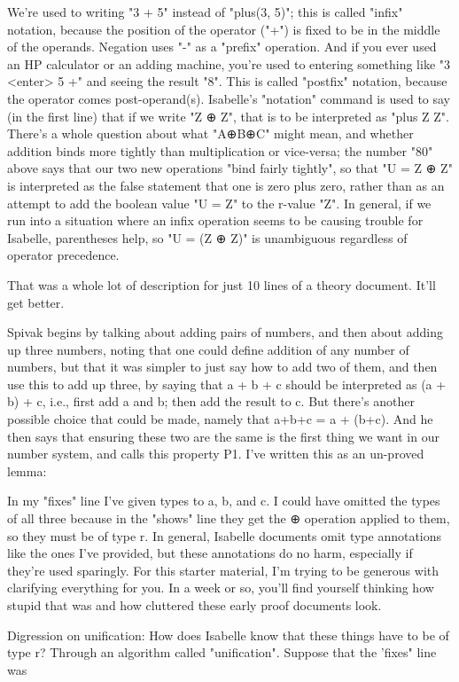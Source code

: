 We're used to writing "3 + 5" instead of "plus(3, 5)"; this is called "infix" notation, because the position of the operator ("+") is fixed to be in the middle of the operands. Negation uses "-" as a "prefix" operation. And if you ever used an HP calculator or an adding machine, you're used to entering something like "3 <enter> 5 +" and seeing the result "8". This is called "postfix" notation, because the operator comes post-operand(s). Isabelle's "notation" command is used to say (in the first line) that if we write "Z ⊕ Z", that is to be interpreted as "plus Z Z". There's a whole question about what "A⊕B⊕C" might mean, and whether addition binds more tightly than multiplication or vice-versa; the number "80" above says that our two new operations "bind fairly tightly", so that "U = Z ⊕ Z" is interpreted as the false statement that one is zero plus zero, rather than as an attempt to add the boolean value "U = Z" to the r-value "Z". In general, if we run into a situation where an infix operation seems to be causing trouble for Isabelle, parentheses help, so "U = (Z ⊕ Z)" is unambiguous regardless of operator precedence. 

That was a whole lot of description for just 10 lines of a theory document. It'll get better. 

Spivak begins by talking about adding pairs of numbers, and then about adding up three numbers, noting that one could define addition of any number of numbers, but that it was simpler to just say how to add two of them, and then use this to add up three, by saying that a + b + c should be interpreted as (a + b) + c, i.e., first add a and b; then add the result to c. But there's another possible choice that could be made, namely that a+b+c = a + (b+c). And he then says that ensuring these two are the same is the first thing we want in our number system, and calls this property P1. I've written this as an un-proved lemma: 

In my "fixes" line I've given types to a, b, and c. I could have omitted the types of all three because in the "shows" line they get the ⊕ operation applied to them, so they must be of type r. In general, Isabelle documents omit type annotations like the ones I've provided, but these annotations do no harm, especially if they're used sparingly. For this starter material, I'm trying to be generous with clarifying everything for you. In a week or so, you'll find yourself thinking how stupid that was and how cluttered these early proof documents look. 

Digression on unification: How does Isabelle know that these things have to be of type r? Through an algorithm called "unification". Suppose that the 'fixes" line was 
 
